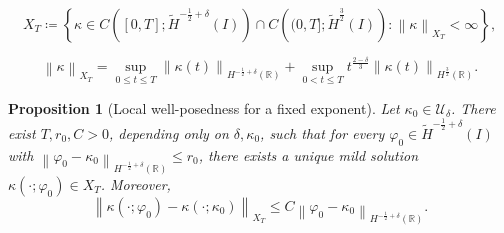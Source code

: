 \documentclass[10pt,a4paper]{amsart}
\newtheorem{proposition}{Proposition}
\newcommand{\R}{\mathbb{R}}
\newcommand{\hr}[1]{H^{#1}(\R)}
\newcommand{\mc}[1]{\mathcal{#1}}
\newcommand{\norm}[1]{\left\lVert #1 \right\rVert}
\newcommand{\paren}[1]{\left(#1\right)}
\newcommand{\thi}[1]{\wt H^{#1}(I)}
\newcommand{\vph}{\varphi}
\newcommand{\wt}[1]{\widetilde{#1}}
\begin{document}
\begin{equation}\label{eqn:XT-intro}
    X_T
    \coloneqq
    \left\{
    \kappa\in C\paren{[0,T];\thi{-\frac12+\delta}}
    \cap C\paren{(0,T];\thi{\frac32}}:
    \norm{\kappa}_{X_T}<\infty
    \right\},
\end{equation}

\begin{equation}\label{eqn:XT-norm-intro}
    \norm{\kappa}_{X_T}
    =
    \sup_{0\le t\le T}
    \norm{\kappa(t)}_{\hr{-\frac12+\delta}}
    +
    \sup_{0<t\le T}
    t^{\frac{2-\delta}{3}}
    \norm{\kappa(t)}_{\hr{\frac32}}.
\end{equation}

\begin{proposition}[Local well-posedness for a fixed exponent]
\label{prop:local-fixed-exponent}
Let $\kappa_0\in\mc U_\delta$. There exist $T,r_0,C>0$, depending only on
$\delta,\kappa_0$, such that for every $\vph_0\in\thi{-\frac12+\delta}$ with
$\norm{\vph_0-\kappa_0}_{\hr{-\frac12+\delta}}\le r_0$, there exists a unique mild
solution $\kappa(\cdot;\vph_0)\in X_T$. Moreover,
\begin{equation}\label{eqn:local-fixed-lipschitz}
    \norm{\kappa(\cdot;\vph_0)-\kappa(\cdot;\kappa_0)}_{X_T}
    \le C\norm{\vph_0-\kappa_0}_{\hr{-\frac12+\delta}}.
\end{equation}
\end{proposition}
\end{document}
